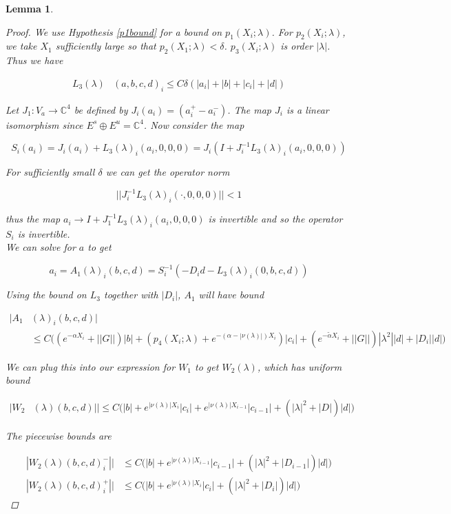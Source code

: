 \documentclass[12pt]{article}
\def\C{{\mathbb C}}
\newtheorem{lemma}{Lemma}
\begin{document}
\begin{lemma}
\begin{proof}
We use Hypothesis \ref{p1bound} for a bound on $p_1(X_i; \lambda)$. For $p_2(X_i; \lambda)$, we take $X_1$ sufficiently large so that $p_2(X_1; \lambda) < \delta$. $p_3(X_i; \lambda)$ is order $|\lambda|$. Thus we have

\begin{align*}
L_3(\lambda)&(a, b, c, d)_i \leq C \delta (|a_i| + |b| + |c_i| + |d|)
\end{align*}

Let $J_1: V_a \rightarrow \C^4$ be defined by $J_i(a_i) = (a_i^+ - a_i^-)$. The map $J_i$ is a linear isomorphism since $E^s \oplus E^u = \C^4$. Now consider the map

\[
S_i(a_i) = J_i (a_i) + L_3(\lambda)_i(a_i, 0, 0, 0) = J_i( I + J_i^{-1} L_3(\lambda)_i(a_i, 0, 0, 0))
\]

For sufficiently small $\delta$ we can get the operator norm 

\[
||J_i^{-1} L_3(\lambda)_i(\cdot, 0, 0, 0)|| < 1
\]

thus the map $a_i \rightarrow I + J_1^{-1} L_3(\lambda)_i(a_i, 0, 0, 0)$ is invertible and so the operator $S_i$ is invertible.\\

We can solve for $a$ to get

\[
a_i = A_1(\lambda)_i(b, c, d) = S_i^{-1}(-D_i d - L_3(\lambda)_i(0, b, c, d))
\]

Using the bound on $L_3$ together with $|D_i|$, $A_1$ will have bound

\begin{align*}
|A_1&(\lambda)_i(b, c, d)| \\
&\leq C \Big( (e^{-\alpha X_i} + ||G||) |b| + ( p_4(X_i; \lambda) + e^{-(\alpha - |\nu(\lambda)|)X_i} )|c_i|
+ (e^{-\tilde{\alpha} X_i} + ||G||) |\lambda^2| |d| + |D_i||d| \Big)
\end{align*} 

We can plug this into our expression for $W_1$ to get $W_2(\lambda)$, which has uniform bound

\begin{align*}
|W_2&(\lambda)(b,c,d)|| 
\leq C \Big( |b| + e^{|\nu(\lambda)|X_i}|c_i| + e^{|\nu(\lambda)|X_{i-1}}|c_{i-1}| + (|\lambda|^2 + |D|)|d| \Big)
\end{align*}

The piecewise bounds are

\begin{align*}
|W_2(\lambda)(b,c,d)_i^-|| 
&\leq C \Big( |b| + e^{|\nu(\lambda)|X_{i-1}}|c_{i-1}| + (|\lambda|^2 + |D_{i-1}|)|d| \Big) \\
|W_2(\lambda)(b,c,d)_i^+|| 
&\leq C \Big( |b| + e^{|\nu(\lambda)|X_i}|c_i| + (|\lambda|^2 + |D_i|)|d| \Big)
\end{align*}


\end{proof}
\end{lemma}
\end{document}
